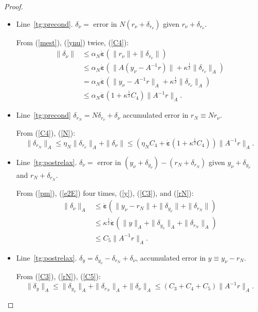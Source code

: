 \documentclass[onefignum,onetabnum]{siamart220329}
\newcommand{\ewed}{\boldsymbol{\dot{\varepsilon}}}
\begin{document}
{\begin{proof}
\begin{itemize}
\item Line~\ref{tg:precond}. $\delta_\nu =$ error in  $N(r_\nu + \delta_{r_\nu})$ given $r_\nu + \delta_{r_\nu}$.

From (\ref{mest}), (\ref{ynu}) twice, (\ref{C4}):
\begin{align}
\|\delta_\nu\| &\le \alpha_N \ewed (\|r_\nu\| + \|\delta_{r_\nu}\|) \label{N} \\
&\le \alpha_N \ewed (\|A(y_\nu - A^{-1}r)\| + \kappa^\frac{1}{2} \|\delta_{r_\nu}\|_A) \nonumber \\
&= \alpha_N \ewed (\|y_\nu - A^{-1}r\|_A + \kappa^\frac{1}{2} \|\delta_{r_\nu}\|_A) \nonumber \\
&\le \alpha_N \ewed (1 + \kappa^\frac{1}{2} C_4) \|A^{-1}r\|_A \nonumber.
\end{align}

\item Line~\ref{tg:precond} $\delta_{r_N} = N\delta_{r_\nu} + \delta_\nu$ accumulated error in  $r_N \equiv N r_\nu$.

From (\ref{C4}), (\ref{N}):
\begin{equation}
\|\delta_{r_N}\|_A \le \eta_N \|\delta_{r_\nu}\|_A + \|\delta_\nu\| \le (\eta_N C_4 + \ewed (1 + \kappa^\frac{1}{2} C_4)) \|A^{-1}r\|_A  .
\label{rN}
\end{equation}

\item Line~\ref{tg:postrelax}. $\delta_\nu =$ error in  $(y_\nu + \delta_{y_\nu}) - (r_N + \delta_{r_N})$ given $y_\nu + \delta_{y_\nu}$ and $r_N + \delta_{r_N}$.

From (\ref{pm}), (\ref{e2E}) four times, (\ref{y}), (\ref{C3}), and (\ref{rN}):
\begin{align}
\label{C5}
\|\delta_\nu\|_A  
&\le \ewed  (\|y_\nu - r_N\| + \|\delta_{y_\nu}\| + \|\delta_{r_N}\|)  \\
&\le \kappa^\frac{1}{2} \ewed  (\|y\|_A + \|\delta_{y_\nu}\|_A + \|\delta_{r_N}\|_A)  \nonumber \\
&\le C_5 \|A^{-1}r\|_A \nonumber .
\end{align}

\item Line~\ref{tg:postrelax}. $\delta_y = \delta_{y_\nu} - \delta_{r_N} + \delta_\nu$,  accumulated error in  $y \equiv y_\nu - r_N$.

From (\ref{C3}), (\ref{rN}), (\ref{C5}):
\[
\|\delta_y\|_A \le \|\delta_{y_\nu}\|_A + \|\delta_{r_N}\|_A + \|\delta_\nu\|_A \le (C_3 + C_4 + C_5) \|A^{-1}r\|_A .
\]
\end{itemize}
\end{proof}

}
\end{document}
